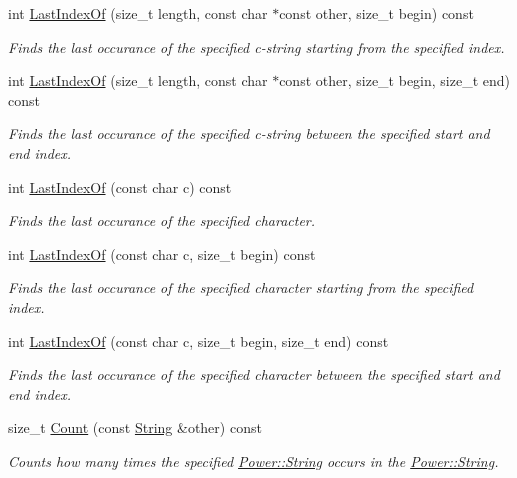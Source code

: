 \begin{DoxyCompactItemize}
int \hyperlink{class_power_1_1_string_a5ba9aa7b251309c1ec5c977f3148e93f}{Last\+Index\+Of} (size\+\_\+t length, const char $\ast$const other, size\+\_\+t begin) const
\begin{DoxyCompactList}\small\item\em Finds the last occurance of the specified c-\/string starting from the specified index. \end{DoxyCompactList}\item 
int \hyperlink{class_power_1_1_string_abf58cac446f5479ae4436974bad5e4af}{Last\+Index\+Of} (size\+\_\+t length, const char $\ast$const other, size\+\_\+t begin, size\+\_\+t end) const
\begin{DoxyCompactList}\small\item\em Finds the last occurance of the specified c-\/string between the specified start and end index. \end{DoxyCompactList}\item 
int \hyperlink{class_power_1_1_string_a5d19cb2d35f6cd396c1910579b5ba89e}{Last\+Index\+Of} (const char c) const
\begin{DoxyCompactList}\small\item\em Finds the last occurance of the specified character. \end{DoxyCompactList}\item 
int \hyperlink{class_power_1_1_string_a0791550659fc2f5c9728eac06208d73c}{Last\+Index\+Of} (const char c, size\+\_\+t begin) const
\begin{DoxyCompactList}\small\item\em Finds the last occurance of the specified character starting from the specified index. \end{DoxyCompactList}\item 
int \hyperlink{class_power_1_1_string_a983604990be4acb0f22ab400b46445ea}{Last\+Index\+Of} (const char c, size\+\_\+t begin, size\+\_\+t end) const
\begin{DoxyCompactList}\small\item\em Finds the last occurance of the specified character between the specified start and end index. \end{DoxyCompactList}\item 
size\+\_\+t \hyperlink{class_power_1_1_string_ac99c5daa4a086b862f0665f34bc0d215}{Count} (const \hyperlink{class_power_1_1_string}{String} \&other) const
\begin{DoxyCompactList}\small\item\em Counts how many times the specified \hyperlink{class_power_1_1_string}{Power\+::\+String} occurs in the \hyperlink{class_power_1_1_string}{Power\+::\+String}. \end{DoxyCompactList}\item 

\end{DoxyCompactItemize}

